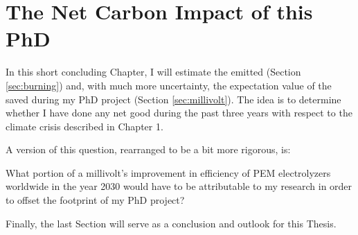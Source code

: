 

\chapter{The Net Carbon Impact of this PhD}\label{ch:impact}

In this short concluding Chapter, I will estimate the  emitted (Section \ref{sec:burning}) and, with much more uncertainty, the expectation value of the  saved during my PhD project (Section \ref{sec:millivolt}). The idea is to determine whether I have done any net good during the past three years with respect to the climate crisis described in Chapter 1.

A version of this question, rearranged to be a bit more rigorous, is:
\begin{question}
	What portion of a millivolt's improvement in efficiency of PEM electrolyzers worldwide in the year 2030 would have to be attributable to my research in order to offset the  footprint of my PhD project? \label{q:impact}
\end{question}

Finally, the last Section will serve as a conclusion and outlook for this Thesis.




\label{sec:millivolt}


\label{sec:conclusion}